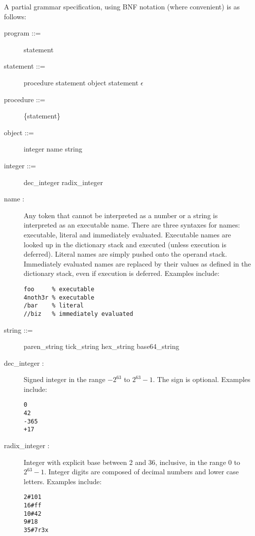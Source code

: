 A partial grammar specification, using BNF notation (where convenient) is as
follows:

\begin{description}

\item[{\lt}program{\gt} ::= ] {\lt}statement{\gt}

\item[{\lt}statement{\gt} ::= ] {\lt}procedure{\gt} {\lt}statement{\gt} {\pipe}
{\lt}object{\gt} {\lt}statement{\gt} {\pipe} $\epsilon$

\item[{\lt}procedure{\gt} ::= ] \{{\lt}statement{\gt}\}

\item[{\lt}object{\gt} ::= ] {\lt}integer{\gt} {\pipe} {\lt}name{\gt} {\pipe}
{\lt}string{\gt}

\item[{\lt}integer{\gt} ::= ] {\lt}dec\_integer{\gt} {\pipe}
{\lt}radix\_integer{\gt}

\item[{\lt}name{\gt} : ] Any token that cannot be interpreted as a number or a
string is interpreted as an executable name.  There are three syntaxes for
names: executable, literal and immediately evaluated.  Executable names are
looked up in the dictionary stack and executed (unless execution is deferred).
Literal names are simply pushed onto the operand stack.  Immediately evaluated
names are replaced by their values as defined in the dictionary stack, even if
execution is deferred.  Examples include:
\begin{verbatim}
foo     % executable
4noth3r % executable
/bar    % literal
//biz   % immediately evaluated
\end{verbatim}

\item[{\lt}string{\gt} ::= ] {\lt}paren\_string{\gt} {\pipe}
{\lt}tick\_string{\gt} {\pipe} {\lt}hex\_string{\gt} {\pipe}
{\lt}base64\_string{\gt}

\item[{\lt}dec\_integer{\gt} : ] Signed integer in the range $-2^{63}$ to
$2^{63} - 1$.  The sign is optional.  Examples include:
\begin{verbatim}
0
42
-365
+17
\end{verbatim}

\item[{\lt}radix\_integer{\gt} : ] Integer with explicit base between 2 and 36,
inclusive, in the range $0$ to $2^{63} - 1$.  Integer digits are composed of
decimal numbers and lower case letters.  Examples include:
\begin{verbatim}
2#101
16#ff
10#42
9#18
35#7r3x
\end{verbatim}


\end{description}
